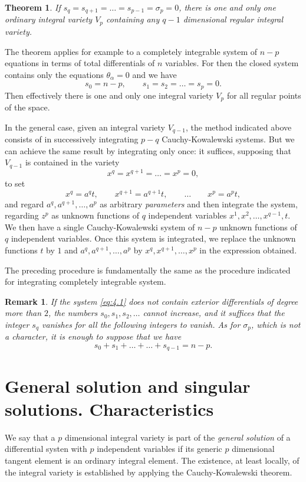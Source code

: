 \documentclass[leqno,11pt]{book}
\numberwithin{equation}{chapter}
\theoremstyle{shape1}
\newtheorem*{thm*}{\hspace{15pt}Theorem}
\theoremstyle{shape0}
\newtheorem*{rmk*}{\hspace{15pt}Remark}
\theoremstyle{shape2}
\theoremstyle{definition}
\begin{document}
\begin{thm*}
  If $s_{q}=s_{q+1}=\dots=s_{p-1}=\sigma_{p}=0$, there is one and only one ordinary integral variety $V_{p}$ containing any $q-1$ dimensional regular integral variety.
\end{thm*}
The theorem applies for example to a completely integrable system of $n-p$ equations in terms of total differentials of $n$ variables. For then the closed system contains only the equations $\theta_{\alpha}=0$ and we have
\[
s_{0}=n-p,\qquad s_{1}=s_{2}=\dots=s_{p}=0.
\]
Then effectively there is one and only one integral variety $V_{p}$ for all regular points of the space.

In the general case, given an integral variety $V_{q-1}$, the method indicated above consists of in successively integrating $p-q$ Cauchy-Kowalewski systems. But we can achieve the same result by integrating only once: it suffices, supposing that $V_{q-1}$ is contained in the variety 
\[
x^{q}=x^{q+1}=\dots=x^{p}=0,
\]
to set
\[
x^{q}=a^{q}t,\qquad x^{q+1}=a^{q+1}t,\qquad\dots\qquad x^{p}=a^{p}t,
\]
and regard $a^{q},a^{q+1},\dots,a^{p}$ as arbitrary \emph{parameters} and then integrate the system, regarding  $z^{p}$  as unknown functions of $q$ independent variables $x^{1},x^{2},\dots,x^{q-1},t$. We then have a single Cauchy-Kowalewski system of $n-p$ unknown functions of $q$ independent variables. Once this system is integrated, we replace the unknown functions $t$ by $1$ and $a^{q},a^{q+1},\dots,a^{p}$ by $x^{q},x^{q+1},\dots,x^{p}$ in the expression obtained.

The preceding procedure is fundamentally the same as the procedure indicated for integrating completely integrable system.

\begin{rmk*}
  If the system \eqref{eq:4.1} does not contain exterior differentials of degree more than $2$, the numbers $s_{0},s_{1},s_{2},\dots$ cannot increase, and it suffices that the integer $s_{q}$ vanishes for all the following integers to vanish. As for $\sigma_{p}$, which is not a character, it is enough to suppose that we have
\[
s_{0}+s_{1}+\dots+\dots+s_{q-1}=n-p.
\]
\end{rmk*}


\section{General solution and singular solutions. Characteristics}
\label{sec:gener-solut-sing}


\fsec We say that a $p$ dimensional integral variety is part of the \emph{general solution} of a differential systen with $p$ independent variables if its generic $p$ dimensional tangent element is an ordinary integral element. The existence, at least locally, of the integral variety is established by applying the Cauchy-Kowalewski theorem.
\end{document}
